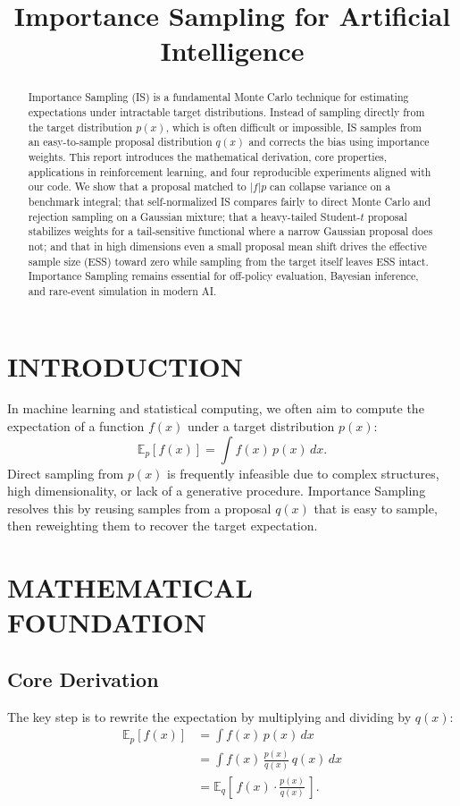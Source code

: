 \documentclass[10pt,a4paper,conference]{IEEEtran}
\title{Importance Sampling for Artificial Intelligence}
\author{
    \IEEEauthorblockN{Mathematics for AI Course Project}
    \IEEEauthorblockA{Yuncong Wang, Xiangqian Wang, Qingfeng Li}
    }
\begin{document}
\maketitle

\begin{abstract}
Importance Sampling (IS) is a fundamental Monte Carlo technique for estimating expectations under intractable target distributions. Instead of sampling directly from the target distribution \(p(x)\), which is often difficult or impossible, IS samples from an easy-to-sample proposal distribution \(q(x)\) and corrects the bias using importance weights. This report introduces the mathematical derivation, core properties, applications in reinforcement learning, and four reproducible experiments aligned with our code. We show that a proposal matched to \(|f|p\) can collapse variance on a benchmark integral; that self-normalized IS compares fairly to direct Monte Carlo and rejection sampling on a Gaussian mixture; that a heavy-tailed Student-\(t\) proposal stabilizes weights for a tail-sensitive functional where a narrow Gaussian proposal does not; and that in high dimensions even a small proposal mean shift drives the effective sample size (ESS) toward zero while sampling from the target itself leaves ESS intact. Importance Sampling remains essential for off-policy evaluation, Bayesian inference, and rare-event simulation in modern AI.
\end{abstract}

\section{INTRODUCTION}
In machine learning and statistical computing, we often aim to compute the expectation of a function \(f(x)\) under a target distribution \(p(x)\):
\[
\mathbb{E}_{p}[f(x)] = \int f(x)\,p(x)\,dx.
\]
Direct sampling from \(p(x)\) is frequently infeasible due to complex structures, high dimensionality, or lack of a generative procedure. Importance Sampling resolves this by reusing samples from a proposal \(q(x)\) that is easy to sample, then reweighting them to recover the target expectation.

\section{MATHEMATICAL FOUNDATION}
\subsection{Core Derivation}
The key step is to rewrite the expectation by multiplying and dividing by \(q(x)\):
\begin{equation}
\begin{aligned}
\mathbb{E}_{p}[f(x)] 
&= \int f(x)\,p(x)\,dx \\
&= \int f(x)\,\frac{p(x)}{q(x)}\,q(x)\,dx \\
&= \mathbb{E}_{q}\!\left[\,f(x)\cdot \frac{p(x)}{q(x)}\,\right].
\end{aligned}
\end{equation}
\end{document}
